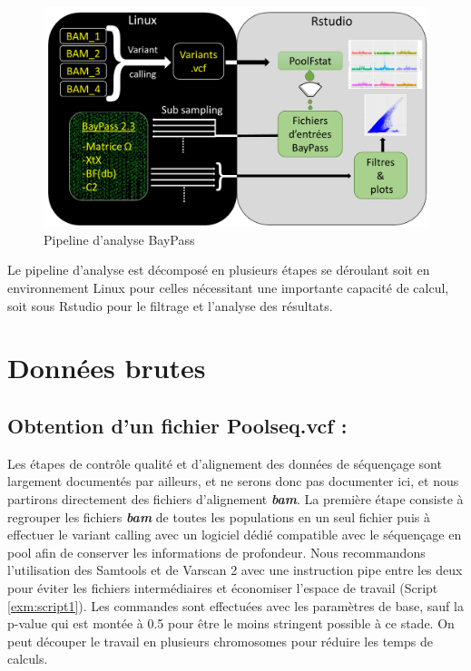 \documentclass[
  openany]{book}
\theoremstyle{definition}
\theoremstyle{definition}
\theoremstyle{definition}
\theoremstyle{definition}
\theoremstyle{remark}
\begin{document}
\begin{figure}
\includegraphics[width=19.67in]{images/Analyse2} \caption{Pipeline d'analyse BayPass}\label{fig:Fig1}
\end{figure}

Le pipeline d'analyse est décomposé en plusieurs étapes se déroulant soit en environnement Linux pour celles nécessitant une importante capacité de calcul, soit sous Rstudio pour le filtrage et l'analyse des résultats.

\hypertarget{donnuxe9es-brutes}{%
\chapter*{Données brutes}\label{donnuxe9es-brutes}}

\hypertarget{obtention-dun-fichier-poolseq.vcf}{%
\section*{Obtention d'un fichier Poolseq.vcf :}\label{obtention-dun-fichier-poolseq.vcf}}

Les étapes de contrôle qualité et d'alignement des données de séquençage sont largement documentés par ailleurs, et ne serons donc pas documenter ici, et nous partirons directement des fichiers d'alignement \textbf{\emph{bam}}. La première étape consiste à regrouper les fichiers \textbf{\emph{bam}} de toutes les populations en un seul fichier puis à effectuer le variant calling avec un logiciel dédié compatible avec le séquençage en pool afin de conserver les informations de profondeur. Nous recommandons l'utilisation des Samtools \citep{li_sequence_2009} et de Varscan 2 \citep{koboldt_varscan_2012} avec une instruction pipe entre les deux pour éviter les fichiers intermédiaires et économiser l'espace de travail (Script \ref{exm:script1}). Les commandes sont effectuées avec les paramètres de base, sauf la p-value qui est montée à 0.5 pour être le moins stringent possible à ce stade. On peut découper le travail en plusieurs chromosomes pour réduire les temps de calculs.
\end{document}
